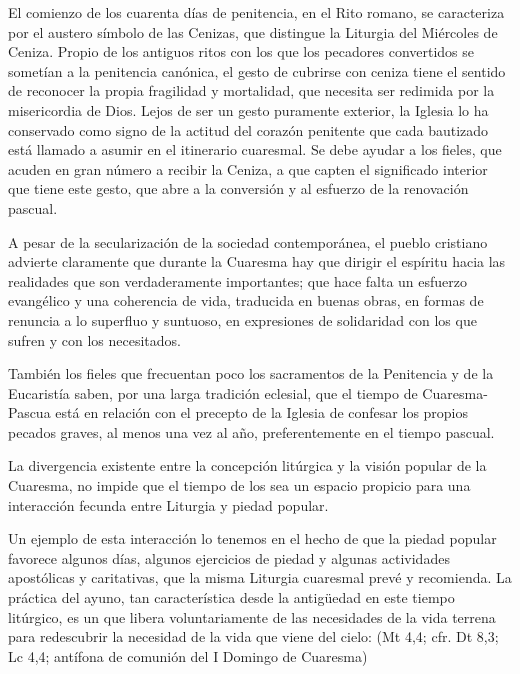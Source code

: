\begin{introstyle}
El comienzo de los cuarenta días de penitencia, en el Rito romano, se caracteriza por el austero símbolo de las Cenizas, que distingue la Liturgia del Miércoles de Ceniza. Propio de los antiguos ritos con los que los pecadores convertidos se sometían a la penitencia canónica, el gesto de cubrirse con ceniza tiene el sentido de reconocer la propia fragilidad y mortalidad, que necesita ser redimida por la misericordia de Dios. Lejos de ser un gesto puramente exterior, la Iglesia lo ha conservado como signo de la actitud del corazón penitente que cada bautizado está llamado a asumir en el itinerario cuaresmal. Se debe ayudar a los fieles, que acuden en gran número a recibir la Ceniza, a que capten el significado interior que tiene este gesto, que abre a la conversión y al esfuerzo de la renovación pascual.

A pesar de la secularización de la sociedad contemporánea, el pueblo cristiano advierte claramente que durante la Cuaresma hay que dirigir el espíritu hacia las realidades que son verdaderamente importantes; que hace falta un esfuerzo evangélico y una coherencia de vida, traducida en buenas obras, en formas de renuncia a lo superfluo y suntuoso, en expresiones de solidaridad con los que sufren y con los necesitados.

También los fieles que frecuentan poco los sacramentos de la Penitencia y de la Eucaristía saben, por una larga tradición eclesial, que el tiempo de Cuaresma-Pascua está en relación con el precepto de la Iglesia de confesar los propios pecados graves, al menos una vez al año, preferentemente en el tiempo pascual.

La divergencia existente entre la concepción litúrgica y la visión popular de la Cuaresma, no impide que el tiempo de los  sea un espacio propicio para una interacción fecunda entre Liturgia y piedad popular.

Un ejemplo de esta interacción lo tenemos en el hecho de que la piedad popular favorece algunos días, algunos ejercicios de piedad y algunas actividades apostólicas y caritativas, que la misma Liturgia cuaresmal prevé y recomienda. La práctica del ayuno, tan característica desde la antigüedad en este tiempo litúrgico, es un  que libera voluntariamente de las necesidades de la vida terrena para redescubrir la necesidad de la vida que viene del cielo:  (Mt 4,4; cfr. Dt 8,3; Lc 4,4; antífona de comunión del I Domingo de Cuaresma)


\end{introstyle}
